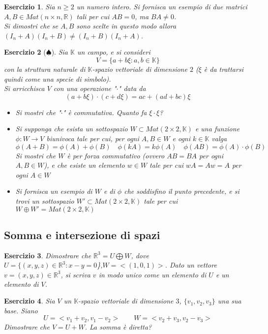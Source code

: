 \documentclass{article}
\newtheorem{es}{Esercizio}
\begin{document}
{\begin{es}
    Sia $n\geq 2$ un numero intero. Si fornisca un esempio di due matrici $A,B\in Mat(n\times n,\mathbb{R})$ tali per cui $AB=0$, ma $BA\neq 0$.\\
    Si dimostri che se $A,B$ sono scelte in questo modo allora  $(I_n+A)(I_n+B)\neq (I_n+B)(I_n+A)$.
\end{es}



\begin{es}[$\spadesuit$]
    Sia $\mathbb{K}$ un campo, e si consideri $$V=\{a+b\xi :a,b\in \mathbb{K}\}$$
    con la struttura naturale di $\mathbb{K}$-spazio vettoriale di dimensione $2$ ($\xi$ è da trattarsi quindi come una specie di simbolo).\\
    Si arricchisca $V$ con una operazione "$\cdot$" data da $$(a+b\xi)\cdot (c+d\xi)=ac+(ad+bc)\xi$$
    \begin{itemize}
        \item Si mostri che "$\cdot$" è commutativa. Quanto fa $\xi\cdot \xi$?
        \item Si supponga che esista un sottospazio $W\subset Mat(2\times 2,\mathbb{K})$ e una funzione $\phi:W\to V$ biunivoca tale per cui, per ogni $A,B\in W$ e ogni $k\in \mathbb{K}$ valga $$\phi(A+B)=\phi(A)+\phi(B)\quad \phi(kA)=k\phi(A)\quad \phi(AB)=\phi(A)\cdot \phi(B)$$
        Si mostri che $W$ è per forza commutativo (ovvero $AB=BA$ per ogni $A,B\in W$), e che esiste un elemento $w\in W$ tale per cui $wA=Aw=A$ per ogni $A\in W$
        \item Si fornisca un esempio di $W$ e di $\phi$ che soddisfino il punto precedente, e si trovi un sottospazio $W'\subset Mat(2\times 2,\mathbb{K})$ tale per cui $W\oplus W'=Mat(2\times 2,\mathbb{K})$
    \end{itemize}
\end{es}






\subsection{Somma e intersezione di spazi}




\begin{es}
    Dimostrare che $\mathbb{R}^3=U\bigoplus W$, dove \\
    $U=\{(x,y,z)\in \mathbb{R}^3:x-y=0$\},$W=<(1,0,1)>$. Dato un vettore $v=(x,y,z)\in \mathbb{R}^3$, si scriva $v$ in modo unico come un elemento di $U$ e un elemento di $V$.
\end{es}
\begin{es}
    Sia $V$ un $\mathbb{K}$-spazio vettoriale di dimensione $3$, $\{v_1,v_2,v_3\}$ una sua base. Siano 
    $$U=<v_1+v_2,v_1-v_2> \qquad  W=<v_2+v_3,v_2-v_3>$$
    Dimostrare che $V=U+W$. La somma è diretta?
\end{es}




}
\end{document}
